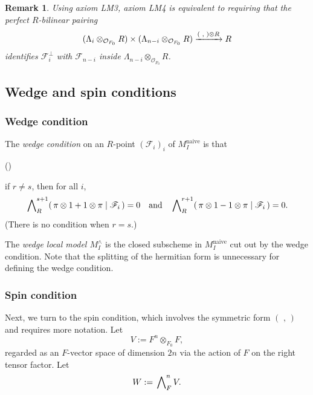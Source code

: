 \documentclass[pdflatex,sn-mathphys-num]{sn-jnl}%
\makeatletter
\theoremstyle{thmstyleone}%
\theoremstyle{thmstyletwo}%
\newtheorem{remark}[subsubsection]{Remark}%
\numberwithin{equation}{subsection}
\theoremstyle{thmstylethree}%
\newcommand{\sF}{\ensuremath{\mathscr{F}}\xspace}
\newcommand{\CF}{\ensuremath{\mathcal{F}}\xspace}
\newcommand{\CO}{\ensuremath{\mathcal{O}}\xspace}
\newcommand{\naive}{\ensuremath{\mathrm{naive}}\xspace}
\newcommand{\sform}{\ensuremath{(\text{~,~})}\xspace}
\newenvironment{altenumerate}
	{\begin{list}
			{(\theenumi) }
			{\usecounter{enumi}
				\setlength{\labelwidth}{0pt}
				\setlength{\labelsep}{0pt}
				\setlength{\leftmargin}{0pt}
				\setlength{\itemsep}{\the\smallskipamount}
				\renewcommand{\theenumi}{\roman{enumi}}
		}}
		{\end{list}}
\newlength{\olen}
\newlength{\ulen}
\newlength{\xlen}
\newcommand{\xra}[2][]{%
		\ifbool{@display}%
		{\settowidth{\olen}{$\overset{#2}{\longrightarrow}$}%
			\settowidth{\ulen}{$\underset{#1}{\longrightarrow}$}%
			\settowidth{\xlen}{$\xrightarrow[#1]{#2}$}%
			\ifdimgreater{\olen}{\xlen}%
			{\underset{#1}{\overset{#2}{\longrightarrow}}}%
			{\ifdimgreater{\ulen}{\xlen}%
				{\underset{#1}{\overset{#2}{\longrightarrow}}}
				{\xrightarrow[#1]{#2}}}}%
		{\xrightarrow[#1]{#2}}
	}
\makeatother
\begin{document}
\begin{remark}
Using axiom {\selectfont LM3}, axiom {\selectfont LM4} is equivalent to requiring that the perfect $R$-bilinear pairing
\begin{equation*}
     (\Lambda_i \otimes_{\CO_{F_0}} R) \times (\Lambda_{n-i} \otimes_{\CO_{F_0}} R)
			\xra{\sform \otimes R} R
\end{equation*}
identifies $\CF_i^\perp$ with $\CF_{n-i}$ inside $\Lambda_{n-i}\otimes_{\CO_{F_0}}R$.
\end{remark}
\subsection{Wedge and spin conditions}\label{moduli_PR}
\subsubsection{Wedge condition}\label{moduli_PR_wedge}
The \emph{wedge condition} on an $R$-point $(\sF_i)_i$ of $M_I^\naive$ is that
\begin{altenumerate}
	\item[\fontfamily{cmtt}\selectfont LM6.]\label{moduli_PR:wedge}
	   if $r \neq s$, then for all $i$,
        \begin{equation*}
            \sideset{}{_R^{s+1}}{\bigwedge} (\,\pi\otimes 1 + 1 \otimes \pi \mid \sF_i\,) = 0
			\quad\text{and}\quad
			\sideset{}{_R^{r+1}}{\bigwedge} (\,\pi\otimes 1 - 1 \otimes \pi \mid \sF_i\,) = 0.
        \end{equation*}
			(There is no condition when $r=s$.)
\end{altenumerate}
		
The \emph{wedge local model $M_I^\wedge$} is the closed subscheme in $M_I^\naive$ cut out by the wedge condition.
Note that the splitting of the hermitian form is unnecessary for defining the wedge condition.

\subsubsection{Spin condition}\label{moduli_PR_spin}
		
Next, we turn to the spin condition, which involves the symmetric form \sform and requires more notation.  Let
\begin{equation*}
    V := F^n \otimes_{F_0} F,
\end{equation*}
regarded as an $F$-vector space of dimension $2n$ via the action of $F$ on the right tensor factor.  Let
\begin{equation*}
    W := \sideset{}{_F^n}\bigwedge V.
\end{equation*} 
		
\end{document}
